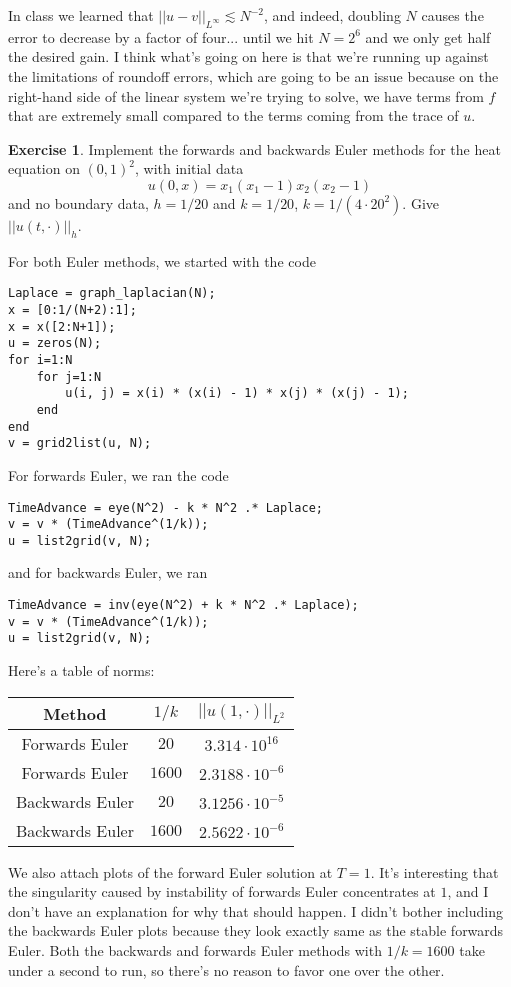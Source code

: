 \documentclass[10pt]{article}
\theoremstyle{definition}
\newtheorem{exer}{Exercise}
\begin{document}
In class we learned that $||u - v||_{L^\infty} \lesssim N^{-2}$, and indeed, doubling $N$ causes the error to decrease by a factor of four... until we hit $N = 2^6$ and we only get half the desired gain. I think what's going on here is that we're running up against the limitations of roundoff errors, which are going to be an issue because on the right-hand side of the linear system we're trying to solve, we have terms from $f$ that are extremely small compared to the terms coming from the trace of $u$.

\begin{exer}
Implement the forwards and backwards Euler methods for the heat equation on $(0, 1)^2$, with initial data
$$u(0, x) = x_1(x_1 - 1)x_2(x_2 - 1)$$
and no boundary data, $h = 1/20$ and $k = 1/20$, $k = 1/(4 \cdot 20^2)$.
Give $||u(t, \cdot)||_h$.
\end{exer}

For both Euler methods, we started with the code

\begin{verbatim}
Laplace = graph_laplacian(N);
x = [0:1/(N+2):1];
x = x([2:N+1]);
u = zeros(N);
for i=1:N
    for j=1:N
        u(i, j) = x(i) * (x(i) - 1) * x(j) * (x(j) - 1);
    end
end
v = grid2list(u, N);
\end{verbatim}

For forwards Euler, we ran the code
\begin{verbatim}
TimeAdvance = eye(N^2) - k * N^2 .* Laplace;
v = v * (TimeAdvance^(1/k));
u = list2grid(v, N);
\end{verbatim}
and for backwards Euler, we ran
\begin{verbatim}
TimeAdvance = inv(eye(N^2) + k * N^2 .* Laplace);
v = v * (TimeAdvance^(1/k));
u = list2grid(v, N);
\end{verbatim}

Here's a table of norms:
\begin{center}\begin{tabular}{c | c | c}
Method & $1/k$ & $||u(1, \cdot)||_{L^2}$ \\
\hline
Forwards Euler & $20$ & $3.314 \cdot 10^{16}$ \\
Forwards Euler & $1600$ & $2.3188 \cdot 10^{-6}$ \\
Backwards Euler & $20$ & $3.1256 \cdot 10^{-5}$ \\
Backwards Euler & $1600$ & $2.5622 \cdot 10^{-6}$ \\
\end{tabular}\end{center}
We also attach plots of the forward Euler solution at $T = 1$.
It's interesting that the singularity caused by instability of forwards Euler concentrates at $1$, and I don't have an explanation for why that should happen.
I didn't bother including the backwards Euler plots because they look exactly same as the stable forwards Euler.
Both the backwards and forwards Euler methods with $1/k = 1600$ take under a second to run, so there's no reason to favor one over the other.
\end{document}
